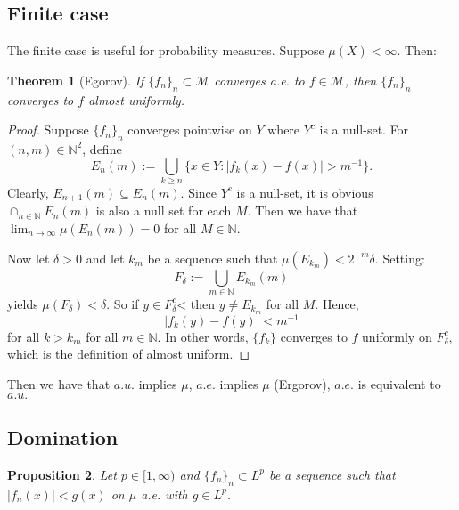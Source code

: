 \documentclass{article}
\newtheorem{theorem}{Theorem}
\newtheorem{proposition}[theorem]{Proposition}
\theoremstyle{definition}
\numberwithin{theorem}{section}
\numberwithin{equation}{section}
\begin{document}
\subsection{Finite case}
The finite case is useful for probability measures. 
Suppose $\mu(X) < \infty$. Then:

\begin{theorem}[Egorov]
	If $\{ f_n\}_n \subset \mathcal{M}$ converges a.e. to $f \in \mathcal{M}$, then $\{ f_n\}_n$ converges to $f$ almost uniformly. 
\end{theorem}

\begin{proof}
	Suppose $\{f_n\}_n$ converges pointwise on $Y$ where $Y^c$ is a null-set. For $(n, m) \in \mathbb{N}^2$, define
	\begin{equation}
		E_n(m) := \bigcup_{k \geq n} \{ x \in Y : |f_k(x) - f(x)| > m^{-1}\}.
	\end{equation}
	Clearly, $E_{n+ 1}(m) \subseteq E_n(m)$. Since $Y^c$ is a null-set, it is obvious $\cap_{n \in \mathbb{N}} E_n(m)$ is also a null set for each $M$. Then we have that $\lim_{n \rightarrow \infty} \mu(E_n(m)) = 0$ for all $M \in \mathbb{N}$. 
	
	Now let $\delta > 0$ and let $k_m$ be a sequence such that $\mu(E_{k_m}) < 2^{-m} \delta$. Setting:
	\begin{equation}
		F_\delta := \bigcup_{m \in \mathbb{N}} E_{k_m}(m)
	\end{equation}
	yields
	$\mu(F_{\delta}) < \delta$. 
	So if $y \in F_\delta^c$< then $y \neq E_{k_m}$ for all $M$. 
	Hence, 
	\begin{equation}
		|f_k(y) - f(y) | < m^{-1}
	\end{equation}
	for all $k > k_m$ for all $m \in \mathbb{N}$. 
	In other words, $\{f_k\}$ converges to $f$ uniformly on $F_\delta^c$, which is the definition of almost uniform.
\end{proof}

Then we have that $a.u.$ implies $\mu$, $a.e.$ implies $\mu$ (Ergorov), $a.e.$ is equivalent to $a.u.$

\subsection{Domination}

\begin{proposition}
	Let $p \in [1, \infty)$ and $\{f_n\}_n \subset L^p$ be a sequence such that $|f_n(x)| < g(x)$ on $\mu$ a.e.
	with $g \in L^p$. 
\end{proposition}
\end{document}
